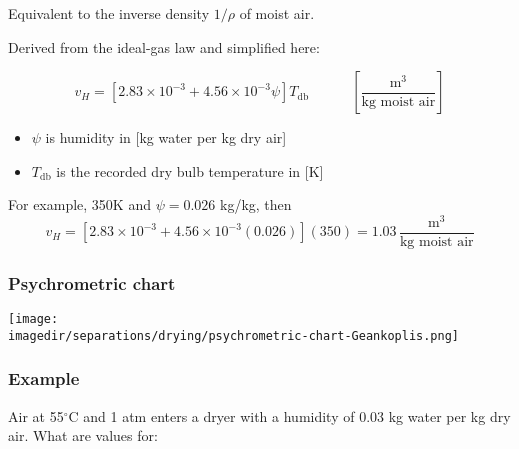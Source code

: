 \begin{frame}\frametitle{{\color{purple}{Humid volume}}}

	Equivalent to the inverse density $1/\rho$ of moist air.

	\vspace{12pt}
	Derived from the ideal-gas law and simplified here:  %
	\begin{exampleblock}{}
		\[ v_H = \left[ 2.83 \times 10^{-3} + 4.56 \times 10^{-3} \psi \right] T_\text{db} \qquad\quad \left[\frac{\text{m}^3}{\text{kg moist air}}\right] \]
	\end{exampleblock}
	\begin{itemize}
		\item	$\psi$ is humidity in [kg water per kg dry air]
		\item	$T_\text{db}$ is the recorded dry bulb temperature in [K]
	\end{itemize}

	\vspace{12pt}
	For example, 350K and $\psi = 0.026$ kg/kg, then
	\[v_H = \left[2.83 \times 10^{-3} + 4.56 \times 10^{-3}(0.026)\right](350)  = 1.03\, \frac{\text{m}^3}{\text{kg moist air}}\]
\end{frame}

\begin{frame}\frametitle{Psychrometric chart}
	\vfill
	\begin{center}
		\texttt{[image: \\imagedir/separations/drying/psychrometric-chart-Geankoplis.png]}
	\end{center}
\end{frame}

\begin{frame}\frametitle{Example}
	Air at 55$^\circ$C and 1 atm enters a dryer with a humidity of 0.03 kg water per kg dry air. What are values for:

	\vspace{12pt}

\end{frame}

